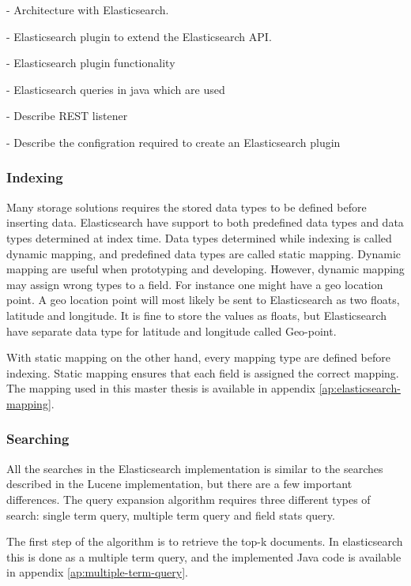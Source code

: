 - Architecture with Elasticsearch.

- Elasticsearch plugin to extend the Elasticsearch API.

- Elasticsearch plugin functionality

- Elasticsearch queries in java which are used

- Describe REST listener

- Describe the configration required to create an Elasticsearch plugin

\subsubsection{Indexing}
Many storage solutions requires the stored data types to be defined before inserting data.
Elasticsearch have support to both predefined data types and data types determined at index time.
Data types determined while indexing is called dynamic mapping, and predefined data types are called static mapping.
Dynamic mapping are useful when prototyping and developing.
However, dynamic mapping may assign wrong types to a field.
For instance one might have a geo location point.
A geo location point will most likely be sent to Elasticsearch as two floats, latitude and longitude.
It is fine to store the values as floats, but Elasticsearch have separate data type for latitude and longitude called Geo-point.

With static mapping on the other hand, every mapping type are defined before indexing.
Static mapping ensures that each field is assigned the correct mapping.
The mapping used in this master thesis is available in appendix \ref{ap:elasticsearch-mapping}.

\subsubsection{Searching}
All the searches in the Elasticsearch implementation is similar to the searches described in the Lucene implementation,
but there are a few important differences.
The query expansion algorithm requires three different types of search:
single term query, multiple term query and field stats query.

The first step of the algorithm is to retrieve the top-k documents.
In elasticsearch this is done as a multiple term query,
and the implemented Java code is available in appendix \ref{ap:multiple-term-query}.

